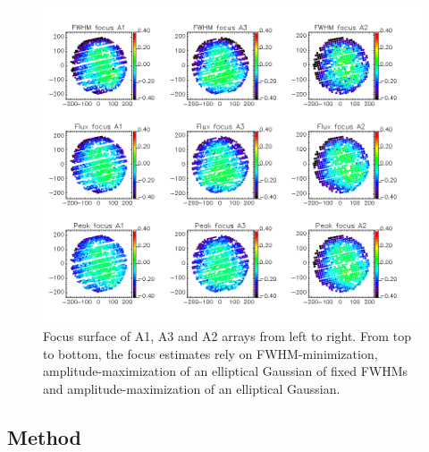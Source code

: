 \begin{figure}
\begin{center}
  \includegraphics[trim={0, 1cm, 0, 1cm}, clip, angle=0, scale=0.5]{Figures/fov_focus_mv_5.png}
\caption[Focus surfaces]{Focus surface of A1, A3 and A2 arrays from left to
  right. From top to bottom, the focus estimates rely on
  FWHM-minimization, amplitude-maximization of an elliptical
  Gaussian of fixed FWHMs and amplitude-maximization of an elliptical
  Gaussian.}
\label{fig:focus-surfaces}
\end{center}
\end{figure}

\subsection{Method}


